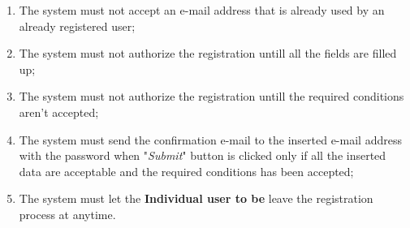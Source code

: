 \begin{enumerate}
  \item The system must not accept an e-mail address that is already used by an already registered user;
  \item The system must not authorize the registration untill all the fields are filled up;
  \item The system must not authorize the registration untill the required conditions aren't accepted;
  \item The system must send the confirmation e-mail to the inserted e-mail address with the password when "\textit{Submit}" button is clicked only if all the inserted data are acceptable and the required conditions has been accepted;
  \item The system must let the \textbf{Individual user to be} leave the registration process at anytime.
\end{enumerate}
